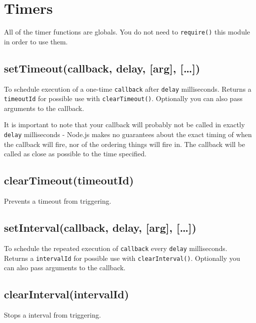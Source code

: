 \section{Timers}

\begin{Shaded}
\begin{Highlighting}[]
\NormalTok{: } 
\end{Highlighting}
\end{Shaded}

All of the timer functions are globals. You do not need to
\texttt{require()} this module in order to use them.

\subsection{setTimeout(callback, delay, {[}arg{]}, {[}\ldots{}{]})}

To schedule execution of a one-time \texttt{callback} after
\texttt{delay} milliseconds. Returns a \texttt{timeoutId} for possible
use with \texttt{clearTimeout()}. Optionally you can also pass arguments
to the callback.

It is important to note that your callback will probably not be called
in exactly \texttt{delay} milliseconds - Node.js makes no guarantees
about the exact timing of when the callback will fire, nor of the
ordering things will fire in. The callback will be called as close as
possible to the time specified.

\subsection{clearTimeout(timeoutId)}

Prevents a timeout from triggering.

\subsection{setInterval(callback, delay, {[}arg{]}, {[}\ldots{}{]})}

To schedule the repeated execution of \texttt{callback} every
\texttt{delay} milliseconds. Returns a \texttt{intervalId} for possible
use with \texttt{clearInterval()}. Optionally you can also pass
arguments to the callback.

\subsection{clearInterval(intervalId)}

Stops a interval from triggering.
